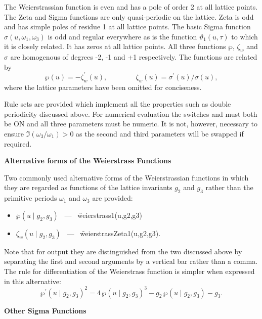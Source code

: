 The Weierstrassian function is even and has a pole of order 2 at all lattice points.
The Zeta and Sigma functions are only quasi-periodic on the lattice. Zeta is odd and has simple poles of residue
1 at all lattice points. The basic Sigma function $\sigma(u,\omega_1,\omega_3)$ is odd and regular everywhere as is
the function $\vartheta_1(u,\tau)$ to which it is closely related. It has zeros at all lattice points. All three functions
$\wp$, $\zeta_w$ and $\sigma$ are homogenous of degrees -2, -1 and +1 respectively. The functions are related by
\[ \wp(u) = -\zeta_w^\prime(u),\qquad\qquad \zeta_w(u) = \sigma^\prime(u)/\sigma(u),\]
where the lattice parameters have been omitted for conciseness.

Rule sets are provided which implement all the properties such as double periodicity discussed above. For numerical evaluation
the switches  and  must both be ON and all three parameters must be numeric. It is not, however,
necessary to ensure $\Im(\omega_3/\omega_1) >0$ as the second and third parameters will be swapped if required.

\textbf{Alternative forms of the Weierstrass Functions}
\hypertarget{WEIERSTRASS1}{}
\hypertarget{WEIERSTRASSZETA1}{}
\hypertarget{operator:WEIERSTRASS1}{}
\hypertarget{operator:WEIERSTRASSZETA1}{}
 

Two commonly used alternative forms of the Weierstrassian functions in which
they are regarded as functions of the lattice invariants $g_2$ and $g_3$
rather than the primitive periods $\omega_1$ and $\omega_3$ are provided:
\begin{itemize}
\item  $\wp(u \mid g_2, g_3)$ \ --- \ \f{weierstrass1(u,g2,g3)}
\item $\zeta_w(u \mid g_2, g_3)$ \ --- \ \f{weierstrassZeta1(u,g2,g3)}.
\end{itemize}
Note that for output they are distinguished from the two discussed above
by separating the first and
second arguments by a vertical bar rather than a comma. The rule for
differentiation of the Weierstrass function is simpler when expressed in
this  alternative:
\[ \wp^\prime(u \mid g_2,g_3)^2 = 4\,\wp(u \mid g_2,g_3)^3
   - g_2\, \wp(u \mid g_2,g_3) -g_3. \]

\textbf{Other Sigma Functions}
\hypertarget{SIGMA1}{}
\hypertarget{operator:SIGMA1}{}
\hypertarget{operator:SIGMA2}{}
\hypertarget{operator:SIGMA3}{}

